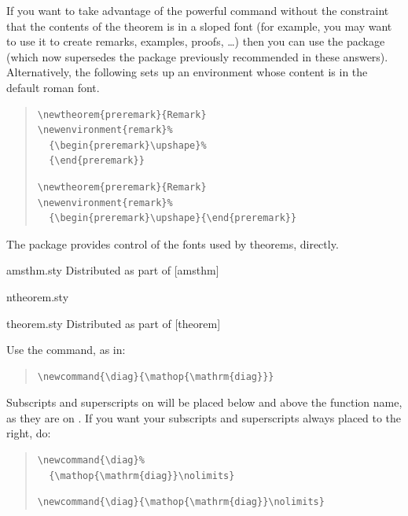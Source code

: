 If you want to take advantage of the powerful  command
without the constraint that the contents of the theorem is in a sloped
font (for example, you may want to use it to create remarks, examples, proofs,
\dots{}) then you can use the \AMSLaTeX{}  package
(which now supersedes the  package previously
recommended in these answers).
Alternatively, the following sets up an environment
 whose content is in the default roman font.
\begin{quote}
\begin{narrowversion}
\begin{verbatim}
\newtheorem{preremark}{Remark}
\newenvironment{remark}%
  {\begin{preremark}\upshape}%
  {\end{preremark}}
\end{verbatim}
\end{narrowversion}
\begin{wideversion}
\begin{verbatim}
\newtheorem{preremark}{Remark}
\newenvironment{remark}%
  {\begin{preremark}\upshape}{\end{preremark}}
\end{verbatim}
\end{wideversion}
\end{quote}
The  package provides control of the fonts used by
theorems, directly.
\begin{ctanrefs}
\item[amsthm.sty]Distributed as part of [amsthm]
\item[ntheorem.sty]
\item[theorem.sty]Distributed as part of [theorem]
\end{ctanrefs}


Use the  command, as in:
\begin{quote}
\begin{verbatim}
\newcommand{\diag}{\mathop{\mathrm{diag}}}
\end{verbatim}
\end{quote}

Subscripts and superscripts on  will be placed below and
above the function name, as they are on
.  If you want your subscripts and superscripts always placed
to the right, do:
\begin{quote}
\begin{narrowversion}
\begin{verbatim}
\newcommand{\diag}%
  {\mathop{\mathrm{diag}}\nolimits}
\end{verbatim}
\end{narrowversion}
\begin{wideversion}
\begin{verbatim}
\newcommand{\diag}{\mathop{\mathrm{diag}}\nolimits}
\end{verbatim}
\end{wideversion}
\end{quote}

